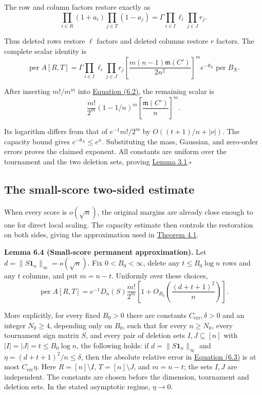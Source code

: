 \documentclass[11pt,a4paper]{article}
\makeatletter
\newcommand{\paperstatement}[3]{\par\addvspace{6pt}\Needspace{4\baselineskip}\phantomsection\def\@currentlabel{#2}\label{#3}\noindent\textbf{#1}\enspace}
\newcommand{\paperref}[2]{\hyperref[#1]{#2}}
\makeatother
\begin{document}
The row and column factors restore exactly as
\[\prod_{i\in R}(1+a_i)\prod_{j\in T}(1-a_j)=\Gamma\prod_{i\in I}\ell_i\prod_{j\in J}r_j.\]

Thus deleted rows restore \(\ell\) factors and deleted columns restore \(r\) factors. The complete scalar identity is
\begin{equation}
\operatorname{per}A[R,T]=\Gamma\prod_{i\in I}\ell_i\prod_{j\in J}r_j\left[\frac{m(n-1)\mathfrak m(C')}{2n^2}\right]^m e^{-\theta_X}\operatorname{per}B_X.
\tag{6.2}\label{eq-exact-restoration}
\end{equation}

After inserting \(m!/m^m\) into \paperref{eq-exact-restoration}{Equation (6.2)}, the remaining scalar is
\[\frac{m!}{2^m}(1-1/n)^m\left[\frac{\mathfrak m(C')}{n}\right]^m.\]

Its logarithm differs from that of \(e^{-1}m!/2^m\) by \(O((t+1)/n+|\nu|)\). The capacity bound gives \(e^{-\theta_X}\le e^\kappa\). Substituting the mass, Gaussian, and zero-order errors proves the claimed exponent. All constants are uniform over the tournament and the two deletion sets, proving \paperref{thm-3.1}{Lemma 3.1}.\nobreak\hspace{.5em}\mbox{$\square$}

\subsection{The small-score two-sided estimate}\label{sec-6.5}

When every score is \(o(\sqrt n)\), the original margins are already close enough to one for direct local scaling. The capacity estimate then controls the restoration on both sides, giving the approximation used in \paperref{thm-4.1}{Theorem 4.1}.

\paperstatement{Lemma 6.4 (Small-score permanent approximation).}{6.4}{thm-6.4} Let \(d=\|S\mathbf 1_n\|_\infty=o(\sqrt n)\). Fix \(0<B_0<\infty\), delete any \(t\le B_0\log n\) rows and any \(t\) columns, and put \(m=n-t\). Uniformly over these choices,
\begin{equation}
\operatorname{per}A[R,T]=e^{-1}D_n(S)\frac{m!}{2^m}\left[1+O_{B_0}\left(\frac{(d+t+1)^2}{n}\right)\right].
\tag{6.3}\label{eq-small-score-permanent}
\end{equation}

More explicitly, for every fixed \(B_0>0\) there are constants \(C_{\mathrm{err}},\delta>0\) and an integer \(N_0\ge4\), depending only on \(B_0\), such that for every \(n\ge N_0\), every tournament sign matrix \(S\), and every pair of deletion sets \(I,J\subseteq[n]\) with \(|I|=|J|=t\le B_0\log n\), the following holds: if \(d=\|S\mathbf1_n\|_\infty\) and \(\eta=(d+t+1)^2/n\le\delta\), then the absolute relative error in \paperref{eq-small-score-permanent}{Equation (6.3)} is at most \(C_{\mathrm{err}}\eta\). Here \(R=[n]\setminus I\), \(T=[n]\setminus J\), and \(m=n-t\); the sets \(I,J\) are independent. The constants are chosen before the dimension, tournament and deletion sets. In the stated asymptotic regime, \(\eta\to0\).
\end{document}
